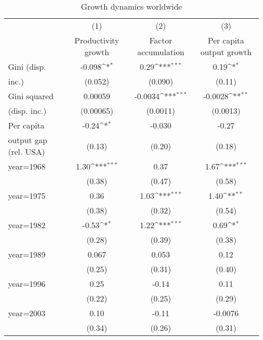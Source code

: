 \begin{sidewaystable}[htbp]\centering
\def\sym#1{\ifmmode^{#1}\else\(^{#1}\)\fi}
\caption{Growth dynamics worldwide}
\begin{tabular}{l*{3}{c}}
\hline\hline
                &\multicolumn{1}{c}{(1)}&\multicolumn{1}{c}{(2)}&\multicolumn{1}{c}{(3)}\\
                &\multicolumn{1}{c}{Productivity growth}&\multicolumn{1}{c}{Factor accumulation}&\multicolumn{1}{c}{Per capita output growth}\\
\hline
Gini (disp.     &   -0.098\sym{*}  &     0.29\sym{***}&     0.19\sym{*}  \\
inc.)           &  (0.052)         &  (0.090)         &   (0.11)         \\
[1em]
Gini squared    &  0.00059         &  -0.0034\sym{***}&  -0.0028\sym{**} \\
(disp. inc.)    &(0.00065)         & (0.0011)         & (0.0013)         \\
[1em]
Per capita      &    -0.24\sym{*}  &   -0.030         &    -0.27         \\
output gap (rel. USA)&   (0.13)         &   (0.20)         &   (0.18)         \\
[1em]
year=1968       &     1.30\sym{***}&     0.37         &     1.67\sym{***}\\
                &   (0.38)         &   (0.47)         &   (0.58)         \\
[1em]
year=1975       &     0.36         &     1.03\sym{***}&     1.40\sym{**} \\
                &   (0.38)         &   (0.32)         &   (0.54)         \\
[1em]
year=1982       &    -0.53\sym{*}  &     1.22\sym{***}&     0.69\sym{*}  \\
                &   (0.28)         &   (0.39)         &   (0.38)         \\
[1em]
year=1989       &    0.067         &    0.053         &     0.12         \\
                &   (0.25)         &   (0.31)         &   (0.40)         \\
[1em]
year=1996       &     0.25         &    -0.14         &     0.11         \\
                &   (0.22)         &   (0.25)         &   (0.29)         \\
[1em]
year=2003       &     0.10         &    -0.11         &  -0.0076         \\
                &   (0.34)         &   (0.26)         &   (0.31)         \\

\end{tabular}
\end{sidewaystable}
